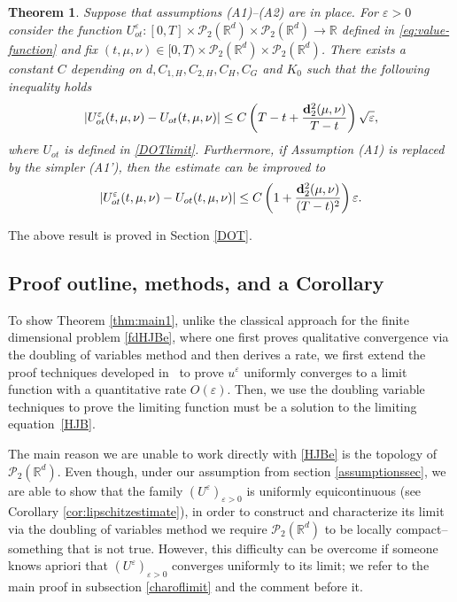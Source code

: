 \documentclass[reqno,11pt]{amsart}
\newtheorem{theorem}{Theorem}[section]
\numberwithin{equation}{section}
\newcommand{\R}{\mathbb{R}} %
\newcommand{\e}{\varepsilon}
\newcommand{\nd}{\noindent}
\begin{document}
\begin{theorem}\label{main3}
    Suppose that assumptions (A1)--(A2) are in place. For $\e>0$ consider the function $U^\e_{ot}\colon [0,T]\times\mathcal{P}_2(\R^d)\times\mathcal{P}_2(\R^d)\to \R$ defined in \eqref{eq:value-function} and fix $(t,\mu,\nu)\in [0,T)\times\mathcal{P}_2(\R^d)\times\mathcal{P}_2(\R^d)$. There exists a constant $C$ depending on  $d, C_{1, H}, C_{2,H}, C_H, C_G$ and $K_0$ such that the following inequality holds
    $$|U^\e_{ot}(t,\mu,\nu)-U_{ot}(t,\mu,\nu)|\le C
\left(T-t+\frac{{\bf d}_2^2(\mu,\nu)}{T-t}  \right)\sqrt{\e},$$
    where $U_{ot}$ is defined in \eqref{DOTlimit}. Furthermore, if Assumption (A1) is replaced by the simpler (A1'), then the estimate can be improved to
    $$|U^\e_{ot}(t,\mu,\nu)-U_{ot}(t,\mu,\nu)|\le C \left(1+\frac{{\bf d}_2^2(\mu,\nu)}{(T-t)^2}\right)\e.$$
\end{theorem}

\nd
The above result is proved in Section \ref{DOT}.

    \subsection{Proof outline, methods, and a Corollary}
    To show Theorem \ref{thm:main1}, unlike the classical approach for the finite dimensional problem \eqref{fdHJBe}, where one first proves qualitative convergence via the doubling of variables method and then derives a rate, we first extend the proof techniques developed in~\cite{TranYu2021} to prove $u^\varepsilon$ uniformly converges to a limit function with a quantitative rate $O(\varepsilon)$. Then, we use the doubling variable techniques to prove the limiting function must be a solution to the limiting equation~\eqref{HJB}.


    \vspace{1mm}

    \nd
    The main reason we are unable to work directly with \eqref{HJBe} is the topology of $\mathcal{P}_2(\R^d)$. Even though, under our assumption from section \ref{assumptionssec}, we are able to show that the family $(U^\e)_{\e>0}$ is uniformly equicontinuous (see Corollary \ref{cor:lipschitzestimate}), in order to construct and characterize its limit via the doubling of variables method we require $\mathcal{P}_2(\R^d)$ to be locally compact-- something that is not true. However, this difficulty can be overcome if someone knows apriori that $(U^\e)_{\e>0}$ converges uniformly to its limit; we refer to the main proof in subsection \ref{charoflimit} and the comment before it.
    \vspace{1.5mm}
\end{document}
